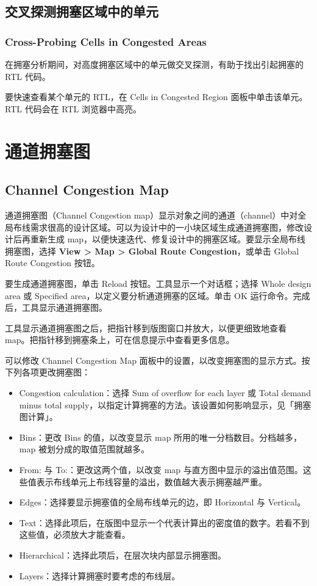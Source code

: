 \subsection{交叉探测拥塞区域中的单元}
\subsubsection*{Cross-Probing Cells in Congested Areas}

在拥塞分析期间，对高度拥塞区域中的单元做交叉探测，有助于找出引起拥塞的 RTL 代码。

要快速查看某个单元的 RTL，在 Cells in Congested Region 面板中单击该单元。RTL 代码会在 RTL 浏览器中高亮。

\section{通道拥塞图}
\subsection*{Channel Congestion Map}

通道拥塞图（Channel Congestion map）显示对象之间的通道（channel）中对全局布线需求很高的设计区域。可以为设计中的一小块区域生成通道拥塞图，修改设计后再重新生成 map，以便快速迭代、修复设计中的拥塞区域。要显示全局布线拥塞图，选择 \textbf{View > Map > Global Route Congestion}，或单击 Global Route Congestion 按钮。

要生成通道拥塞图，单击 Reload 按钮。工具显示一个对话框；选择 Whole design area 或 Specified area，以定义要分析通道拥塞的区域。单击 OK 运行命令。完成后，工具显示通道拥塞图。

工具显示通道拥塞图之后，把指针移到版图窗口并放大，以便更细致地查看 map。把指针移到拥塞条上，可在信息提示中查看更多信息。

可以修改 Channel Congestion Map 面板中的设置，以改变拥塞图的显示方式。按下列各项更改拥塞图：
\begin{itemize}
  \item Congestion calculation：选择 Sum of overflow for each layer 或 Total demand minus total supply，以指定计算拥塞的方法。该设置如何影响显示，见「拥塞图计算」。
  \item Bins：更改 Bins 的值，以改变显示 map 所用的唯一分档数目。分档越多，map 被划分成的取值范围就越多。
  \item From: 与 To:：更改这两个值，以改变 map 与直方图中显示的溢出值范围。这些值表示布线单元上布线容量的溢出，数值越大表示拥塞越严重。
  \item Edges：选择要显示拥塞值的全局布线单元的边，即 Horizontal 与 Vertical。
  \item Text：选择此项后，在版图中显示一个代表计算出的密度值的数字。若看不到这些值，必须放大才能查看。
  \item Hierarchical：选择此项后，在层次块内部显示拥塞图。
  \item Layers：选择计算拥塞时要考虑的布线层。
\end{itemize}


